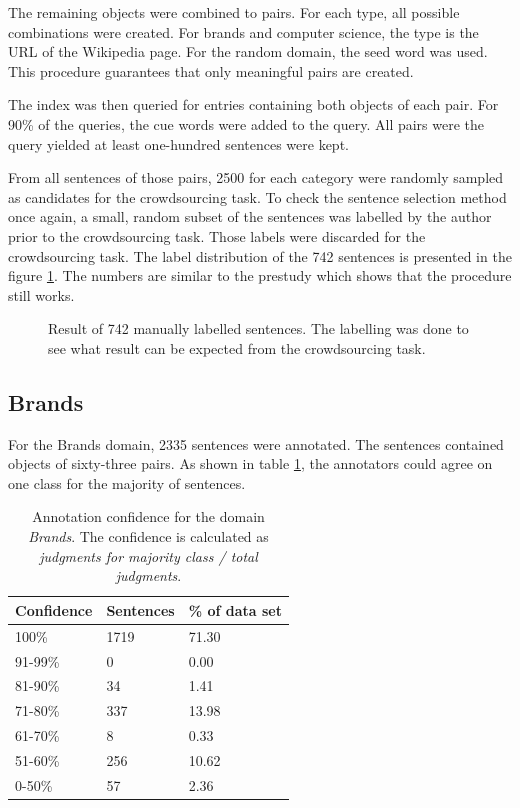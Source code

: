 The remaining objects were combined to pairs. For each type, all possible combinations were created. For brands and computer science, the type is the URL of the Wikipedia page. For the random domain, the seed word was used. This procedure guarantees that only meaningful pairs are created.




The index was then queried for entries containing both objects of each pair. For 90\% of the queries, the cue words were added to the query. All pairs were the query yielded at least one-hundred sentences were kept.

From all sentences of those pairs, 2500 for each category were randomly sampled as candidates for the crowdsourcing task. To check the sentence selection method once again, a small, random subset of the sentences was labelled by the author prior to the crowdsourcing task. Those labels were discarded for the crowdsourcing task.
The label distribution of the 742 sentences is presented in the figure \ref{fig:sample}. The numbers are similar to the prestudy which shows that the procedure still works.


\begin{figure}[h]
\centering
\caption{Result of 742 manually labelled sentences. The labelling was done to see what result can be expected from the crowdsourcing task.}
\label{fig:sample}
\end{figure}

\subsection{Brands}
\label{sec:brands}

For the Brands domain, 2335 sentences were annotated. The sentences contained objects of sixty-three pairs. As shown in table \ref{fig:brand_agg}, the annotators could agree on one class for the majority of sentences.


\begin{table}[h]
\caption{Annotation confidence for the domain \emph{Brands}. The confidence is calculated as \emph{judgments for majority class / total judgments}.}
\label{fig:brand_agg}
\begin{tabularx}{\textwidth}{XXX}
\toprule
Confidence & Sentences & \% of data set \\
\midrule
100\%	&	1719	&	71.30	 \\ 
91-99\%	&	0	&	0.00	 \\ 
81-90\%	&	34	&	1.41	 \\ 
71-80\%	&	337	&	13.98	 \\ 
61-70\%	&	8	&	0.33	 \\ 
51-60\%	&	256	&	10.62	 \\ 
0-50\%	&	57	&	2.36	 \\ 
\bottomrule
\end{tabularx}
\end{table}



